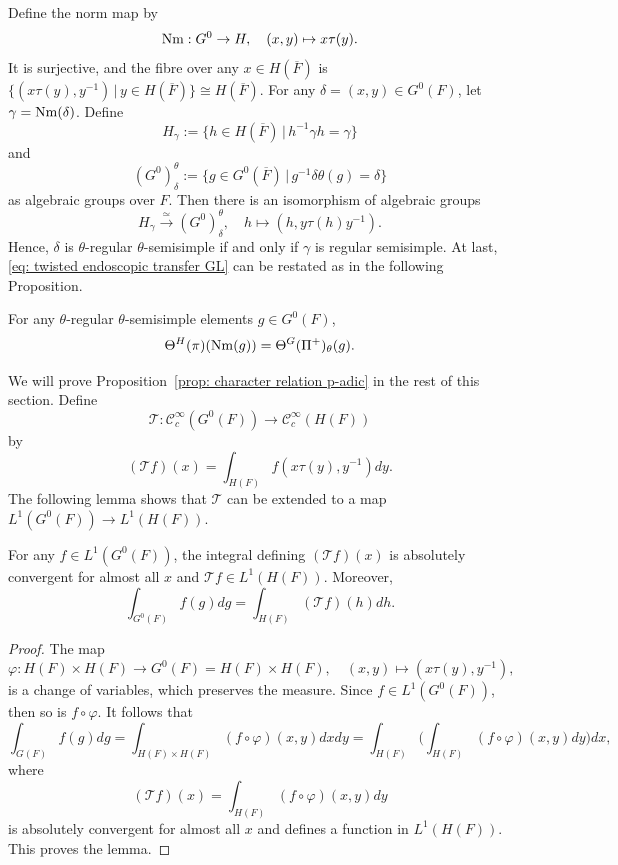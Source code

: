 \documentclass[11pt,letterpaper]{amsart}
\numberwithin{equation}{section}
\begin{document}
Define the norm map by
\[
{\rm Nm}: G^0 \rightarrow H, \quad (x, y) \mapsto x \tau(y).
\]
It is surjective, and the fibre over any $x \in H(\overline{F})$ is $\{(x\tau(y), y^{-1}) \, | \, y \in H(\overline{F})\} \cong H(\overline{F})$. For any $\delta = (x, y) \in G^0(F)$, let $\gamma = {\rm Nm}(\delta)$. Define
\[
H_{\gamma} := \{h \in H(\overline{F}) \, | \, h^{-1} \gamma h = \gamma \}
\]
and
\[
(G^{0})^{\theta}_{\delta} := \{g \in G^0(\overline{F}) \, | \, g^{-1}\delta \theta(g) = \delta \}
\]
as algebraic groups over $F$. Then there is an isomorphism of algebraic groups
\[
H_{\gamma} \xrightarrow{\simeq} (G^0)^{\theta}_{\delta}, \quad h \mapsto  (h, y\tau(h)y^{-1}).
\]
Hence, $\delta$ is $\theta$-regular $\theta$-semisimple if and only if $\gamma$ is regular semisimple. At last, \eqref{eq: twisted endoscopic transfer GL} can be restated as in the following Proposition.

\begin{proposition}
\label{prop: character relation p-adic}
For any $\theta$-regular $\theta$-semisimple elements $g \in G^0(F)$,  
\[
\Theta^{H}(\pi)({\rm Nm}(g)) = \Theta^{G}(\Pi^{+})_{\theta}(g).
\]
\end{proposition}




We will prove Proposition~\ref{prop: character relation p-adic} in the rest of this section. Define
\[
\mathcal{T}: \mathcal{C}^{\infty}_{c}(G^0(F)) \rightarrow \mathcal{C}^{\infty}_{c}(H(F))
\]
by
\[
(\mathcal{T}f)(x) = \int_{H(F)}f(x\tau(y), y^{-1})dy.
\]
The following lemma shows that $\mathcal{T}$ can be extended to a map $L^{1}(G^0(F)) \rightarrow L^{1}(H(F))$.


\begin{lemma}
\label{lemma: change variable p-adic}
For any $f \in L^{1}(G^0(F))$, the integral defining
\(
(\mathcal{T}f)(x)
\)
is absolutely convergent for almost all $x$ and $\mathcal{T}f \in L^{1}(H(F))$. Moreover,
\[
\int_{G^0(F)} f(g) dg = \int_{H(F)} (\mathcal{T}f)(h)dh.
\]
\end{lemma}

\begin{proof}
The map
\[
\varphi: H(F) \times H(F) \rightarrow G^0(F) = H(F) \times H(F), \quad (x, y) \mapsto (x\tau(y), y^{-1}),
\]
is a change of variables, which preserves the measure. Since $f \in L^{1}(G^0(F))$, then so is $f \circ \varphi$. It follows that
\[
\int_{G(F)} f(g)dg = \int_{H(F) \times H(F)} (f \circ \varphi)(x, y)dxdy =  \int_{H(F)} \Big(\int_{H(F)} (f \circ \varphi)(x, y)dy \Big)dx,
\]
where 
\[
(\mathcal{T}f)(x) = \int_{H(F)} (f \circ \varphi)(x, y)dy
\]
is absolutely convergent for almost all $x$ and defines a function in $L^{1}(H(F))$. This proves the lemma.
\end{proof}
\end{document}
